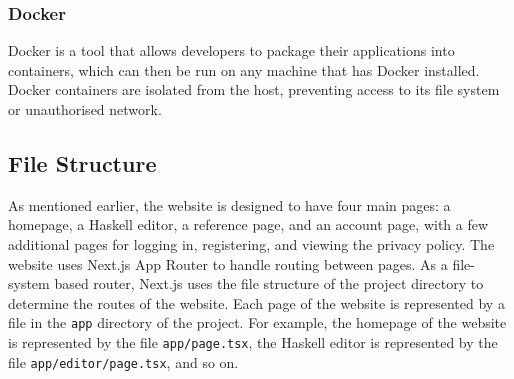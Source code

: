 \documentclass[../main.tex]{subfiles}
\begin{document}
            \subsubsection{Docker}
                Docker is a tool that allows developers to package their applications into
                    containers, which can then be run on any machine that has Docker installed.
                Docker containers are isolated from the host, preventing access to its file
                    system or unauthorised network.

        \subsection{File Structure}
            As mentioned earlier, the website is designed to have four main pages: a
                homepage, a Haskell editor, a reference page, and an account page, with a few
                additional pages for logging in, registering, and viewing the privacy policy.
            The website uses Next.js App Router to handle routing between pages.
            As a file-system based router, Next.js uses the file structure of the project
                directory to determine the routes of the website.
            Each page of the website is represented by a file in the \texttt{app} directory
                of the project.
            For example, the homepage of the website is represented by the file
                \texttt{app/page.tsx}, the Haskell editor is represented by the file
                \texttt{app/editor/page.tsx}, and so on.
\end{document}
